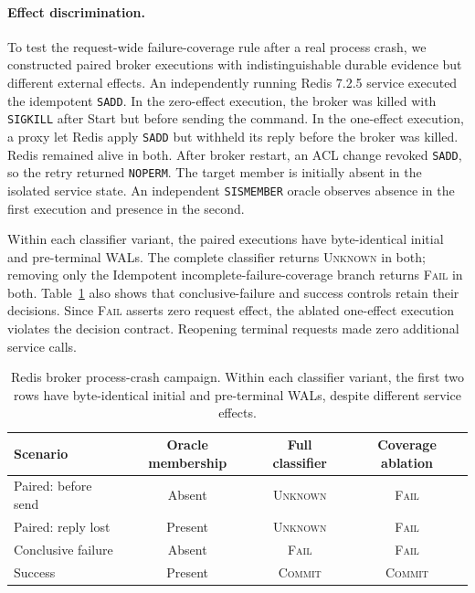 \documentclass[acmsmall,screen,review,anonymous]{acmart}
\newcommand{\Unknown}{\textsc{Unknown}\xspace}
\newcommand{\Commit}{\textsc{Commit}\xspace}
\newcommand{\Fail}{\textsc{Fail}\xspace}
\begin{document}
\paragraph{Effect discrimination.}
To test the request-wide failure-coverage rule after a real process
crash, we constructed paired broker executions with indistinguishable
durable evidence but different external effects. An independently
running Redis 7.2.5 service executed the idempotent \texttt{SADD}.
In the zero-effect execution, the broker was killed with \texttt{SIGKILL}
after Start but before sending the command. In the one-effect execution,
a proxy let Redis apply \texttt{SADD} but withheld its reply before the
broker was killed. Redis remained alive in both. After broker restart,
an ACL change revoked \texttt{SADD}, so the retry returned \texttt{NOPERM}.
The target member is initially absent in the isolated service state.
An independent \texttt{SISMEMBER} oracle observes absence in the first
execution and presence in the second.

Within each classifier variant, the paired executions have byte-identical
initial and pre-terminal WALs. The complete classifier returns \Unknown
in both; removing only the Idempotent incomplete-failure-coverage
branch returns \Fail in both. Table~\ref{tab:redis-crash} also shows
that conclusive-failure and success controls retain their decisions.
Since \Fail asserts zero request effect, the ablated one-effect execution
violates the decision contract. Reopening terminal requests made zero additional service calls.

\begin{table}[t]
  \caption{Redis broker process-crash campaign. Within each classifier
  variant, the first two rows have byte-identical initial and
  pre-terminal WALs, despite different service effects.}
  \label{tab:redis-crash}
  \centering
  \small
  \begin{tabular}{lccc}
    \toprule
    Scenario & Oracle membership & Full classifier & Coverage ablation \\
    \midrule
    Paired: before send & Absent & \Unknown & \Fail \\
    Paired: reply lost & Present & \Unknown & \Fail \\
    Conclusive failure & Absent & \Fail & \Fail \\
    Success & Present & \Commit & \Commit \\
    \bottomrule
  \end{tabular}
\end{table}
\end{document}
